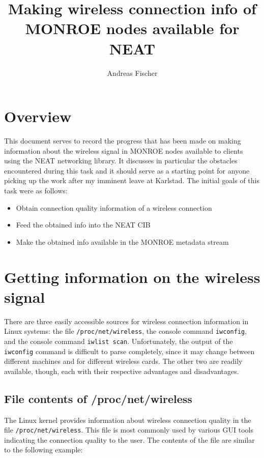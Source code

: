\documentclass{scrartcl}
\begin{document}
\title{Making wireless connection info of MONROE nodes available for NEAT}
\author{Andreas Fischer}
\maketitle

\section*{Overview}

This document serves to record the progress that has been made on making
information about the wireless signal in MONROE nodes available to clients
using the NEAT networking library. It discusses in particular the obstacles
encountered during this task and it should serve as a starting point for
anyone picking up the work after my imminent leave at Karlstad. The initial
goals of this task were as follows:

\begin{itemize}
	\item Obtain connection quality information of a wireless connection
	\item Feed the obtained info into the NEAT CIB
	\item Make the obtained info available in the MONROE metadata stream
\end{itemize}

\section*{Getting information on the wireless signal}

There are three easily accessible sources for wireless connection information
in Linux systems: the file \verb#/proc/net/wireless#, the console command
\verb#iwconfig#, and the console command \verb#iwlist scan#. Unfortunately, the
output of the \verb#iwconfig# command is difficult to parse completely, since
it may change between different machines and for different wireless cards. The
other two are readily available, though, each with their respective advantages
and disadvantages.

\subsection*{File contents of /proc/net/wireless}

The Linux kernel provides information about wireless connection quality in
the file \verb#/proc/net/wireless#. This file is most commonly used by various
GUI tools indicating the connection quality to the user. The contents of the
file are similar to the following example:
\end{document}

